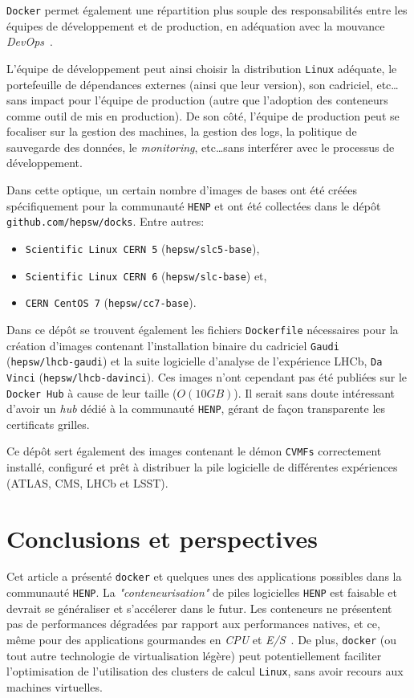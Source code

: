 \documentclass[a4paper]{article}
\begin{document}
\texttt{Docker} permet \'egalement une r\'epartition plus souple des
responsabilit\'es entre les \'equipes de d\'eveloppement et de production, en
ad\'equation avec la mouvance \emph{DevOps}~\cite{ref-devops}.

L'\'equipe de d\'eveloppement peut ainsi choisir la distribution \texttt{Linux}
ad\'equate, le portefeuille de d\'ependances externes (ainsi que leur version),
son cadriciel, etc\ldots sans impact pour l'\'equipe de production (autre que
l'adoption des conteneurs comme outil de mis en production).
De son c\^ot\'e, l'\'equipe de production peut se focaliser sur la gestion des
machines, la gestion des logs, la politique de sauvegarde des donn\'ees, le
\emph{monitoring}, etc\ldots sans interf\'erer avec le processus
de d\'eveloppement.

Dans cette optique, un certain nombre d'images de bases ont \'et\'e cr\'e\'ees
sp\'ecifiquement pour la communaut\'e \texttt{HENP} et ont \'et\'e collect\'ees
dans le d\'ep\^ot \texttt{github.com/hepsw/docks}.
Entre autres:
\begin{itemize}
	\item \texttt{Scientific Linux CERN 5} (\texttt{hepsw/slc5-base}),
	\item \texttt{Scientific Linux CERN 6} (\texttt{hepsw/slc-base}) et,
	\item \texttt{CERN CentOS 7} (\texttt{hepsw/cc7-base}).
\end{itemize}

Dans ce d\'ep\^ot se trouvent \'egalement les fichiers \texttt{Dockerfile}
n\'ecessaires pour la cr\'eation d'images contenant l'installation binaire du
cadriciel \texttt{Gaudi}~\cite{ref-gaudi} (\texttt{hepsw/lhcb-gaudi}) et la
suite logicielle d'analyse de l'exp\'erience LHCb, \texttt{Da Vinci}
(\texttt{hepsw/lhcb-davinci}).
Ces images n'ont cependant pas \'et\'e publi\'ees sur le \texttt{Docker Hub} \`a
cause de leur taille ($O(10 GB)$).
Il serait sans doute int\'eressant d'avoir un \emph{hub} d\'edi\'e \`a la
communaut\'e \texttt{HENP}, g\'erant de fa\c con transparente les certificats
grilles.

Ce d\'ep\^ot sert \'egalement des images contenant le d\'emon \texttt{CVMFs}
correctement install\'e, configur\'e et pr\^et \`a distribuer la pile logicielle
de diff\'erentes exp\'eriences (ATLAS, CMS, LHCb et LSST).

\section*{Conclusions et perspectives}
Cet article a pr\'esent\'e \texttt{docker} et quelques unes des applications
possibles dans la communaut\'e \texttt{HENP}.
La \emph{"conteneurisation"} de piles logicielles \texttt{HENP} est faisable et
devrait se g\'en\'eraliser et s'acc\'elerer dans le futur.
Les conteneurs ne pr\'esentent pas de performances d\'egrad\'ees par rapport aux
performances natives, et ce, m\^eme pour des applications gourmandes en
\emph{CPU} et \emph{E/S}~\cite{ref-bench-0,ref-bench-1}.
De plus, \texttt{docker} (ou tout autre technologie de virtualisation
l\'eg\`ere) peut potentiellement faciliter l'optimisation de l'utilisation des clusters de calcul
\texttt{Linux}, sans avoir recours aux machines virtuelles.
\end{document}
